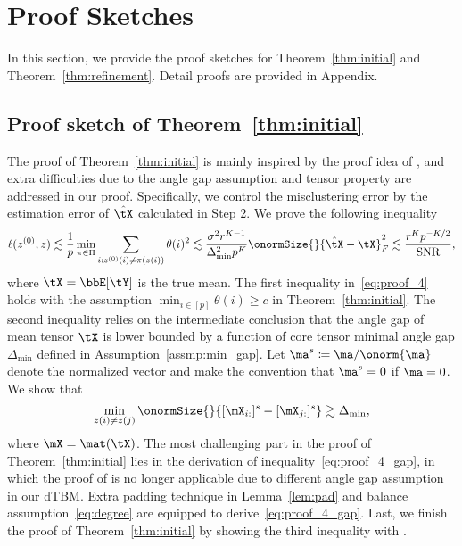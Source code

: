 \documentclass[lettersize,onecolumn,journal]{IEEEtran}
\theoremstyle{definition}
\theoremstyle{definition}
\begin{document}



{
\color{blue}

\section{Proof Sketches}

In this section, we provide the proof sketches for Theorem~\ref{thm:initial} and Theorem~\ref{thm:refinement}. Detail proofs are provided in Appendix.


\subsection{Proof sketch of Theorem~\ref{thm:initial}}
The proof of Theorem~\ref{thm:initial} is mainly inspired by the proof idea of \citet[Lemma 1]{gao2018community}, and extra difficulties due to the angle gap assumption and tensor property are addressed in our proof. Specifically, we control the misclustering error by the estimation error of $\hat \tX$ calculated in Step 2.  We prove the following inequality
\begin{equation}\label{eq:proof_4}
    \ell(z^{(0)},z) \lesssim \frac{1}{p}\min_{\pi \in \Pi} \sum_{i: z^{(0)}(i) \neq \pi(z(i))} \theta(i)^2 \lesssim \frac{\sigma^2 r^{K-1}}{ \Delta_{\min}^2 p^K} \onormSize{}{\hat \tX - \tX}_F^2 \lesssim \frac{r^K p^{-K/2}}{\text{SNR}},
\end{equation}
where $\tX = \bbE[\tY]$ is the true mean. The first inequality in~\eqref{eq:proof_4} holds with the assumption $\min_{i \in [p]} \theta(i) \geq c$ in Theorem~\ref{thm:initial}. The second inequality relies on the intermediate conclusion that the angle gap of mean tensor $\tX$ is lower bounded by a function of core tensor minimal angle gap $\Delta_{\min}$ defined in Assumption~\ref{assmp:min_gap}. Let $\ma^{s} \coloneqq \ma/\onorm{\ma}$ denote the normalized vector and make the convention that $\ma^s = 0$ if $\ma = 0$. We show that
\begin{equation}\label{eq:proof_4_gap}
\min_{z(i) \neq z(j)} \onormSize{}{[\mX_{i:}]^s - [\mX_{j:}]^s} \gtrsim \Delta_{\min},
\end{equation}
where $\mX = \mat(\tX)$. The most challenging part in the proof of Theorem~\ref{thm:initial} lies in the derivation of inequality~\eqref{eq:proof_4_gap}, in which the proof of \cite{gao2018community} is no longer applicable due to different angle gap assumption in our dTBM. Extra padding technique in Lemma~\ref{lem:pad} and balance assumption~\eqref{eq:degree} are equipped to derive~\eqref{eq:proof_4_gap}. Last, we finish the proof of Theorem~\ref{thm:initial} by showing the third inequality with \citet[Proposition 1]{han2020exact}. 


}
\end{document}
